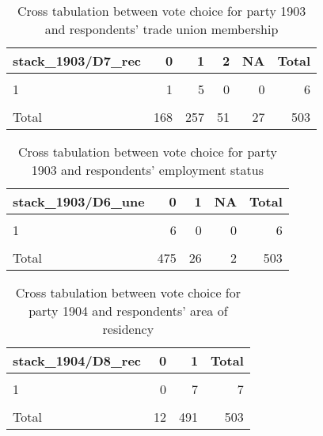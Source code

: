 \documentclass[
]{article}
\begin{document}
\begin{table}

\caption{\label{tab:unnamed-chunk-126}Cross tabulation between vote choice for party 1903 and respondents' trade union 
                   membership \label{table:crosstab_3_4_mt}}
\centering
\begin{tabular}[t]{l|r|r|r|r|r}
\hline
stack\_1903/D7\_rec & 0 & 1 & 2 & NA & Total\\
\hline
\cellcolor{gray!6}{0} & \cellcolor{gray!6}{127} & \cellcolor{gray!6}{192} & \cellcolor{gray!6}{38} & \cellcolor{gray!6}{14} & \cellcolor{gray!6}{371}\\
\hline
1 & 1 & 5 & 0 & 0 & 6\\
\hline
\cellcolor{gray!6}{NA} & \cellcolor{gray!6}{40} & \cellcolor{gray!6}{60} & \cellcolor{gray!6}{13} & \cellcolor{gray!6}{13} & \cellcolor{gray!6}{126}\\
\hline
Total & 168 & 257 & 51 & 27 & 503\\
\hline
\end{tabular}
\end{table}

\begin{table}

\caption{\label{tab:unnamed-chunk-126}Cross tabulation between vote choice for party 1903 and respondents' employment                     status 
                  \label{table:crosstab_3_5_mt}}
\centering
\begin{tabular}[t]{l|r|r|r|r}
\hline
stack\_1903/D6\_une & 0 & 1 & NA & Total\\
\hline
\cellcolor{gray!6}{0} & \cellcolor{gray!6}{352} & \cellcolor{gray!6}{17} & \cellcolor{gray!6}{2} & \cellcolor{gray!6}{371}\\
\hline
1 & 6 & 0 & 0 & 6\\
\hline
\cellcolor{gray!6}{NA} & \cellcolor{gray!6}{117} & \cellcolor{gray!6}{9} & \cellcolor{gray!6}{0} & \cellcolor{gray!6}{126}\\
\hline
Total & 475 & 26 & 2 & 503\\
\hline
\end{tabular}
\end{table}

\begin{table}

\caption{\label{tab:unnamed-chunk-126}Cross tabulation between vote choice for party 1904 and respondents' area of residency 
                   \label{table:crosstab_4_1_mt}}
\centering
\begin{tabular}[t]{l|r|r|r}
\hline
stack\_1904/D8\_rec & 0 & 1 & Total\\
\hline
\cellcolor{gray!6}{0} & \cellcolor{gray!6}{4} & \cellcolor{gray!6}{366} & \cellcolor{gray!6}{370}\\
\hline
1 & 0 & 7 & 7\\
\hline
\cellcolor{gray!6}{NA} & \cellcolor{gray!6}{8} & \cellcolor{gray!6}{118} & \cellcolor{gray!6}{126}\\
\hline
Total & 12 & 491 & 503\\
\hline
\end{tabular}
\end{table}
\end{document}
